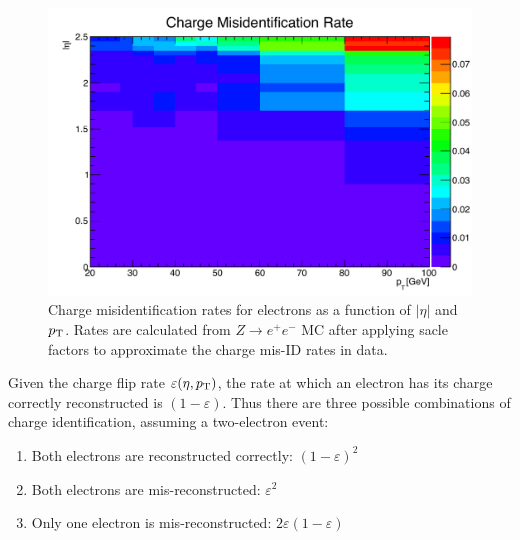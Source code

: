 \begin{figure}
  \centering
  \includegraphics[width=.75\textwidth]{figs/ssww_13tev/backgrounds/charge_flip/charge_flip_2d}
  \caption{Charge misidentification rates for electrons as a function of $|\eta|$ and $p_{\mathrm{T}}$.  Rates are calculated from $Z\rightarrow e^{+}e^{-}$ MC after applying sacle factors to approximate the charge mis-ID rates in data.}
  \label{fig:charge_flip_rates}
\end{figure}

Given the charge flip rate $\varepsilon(\eta,\pt)$, the rate at which an electron has its charge correctly reconstructed is $(1-\varepsilon)$.
Thus there are three possible combinations of charge identification, assuming a two-electron event:
\begin{enumerate}
\item Both electrons are reconstructed correctly: $(1-\varepsilon)^2$
\item Both electrons are mis-reconstructed: $\varepsilon^2$
\item Only one electron is mis-reconstructed: $2\varepsilon(1-\varepsilon)$
\end{enumerate}

